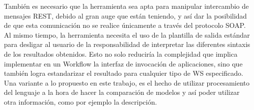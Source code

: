 También es necesario que la herramienta sea apta para manipular intercambio de mensajes REST, debido al gran auge que están teniendo, y así dar la posibilidad de que esta comunicación no se realice únicamente a través del protocolo SOAP.\\

Al mismo tiempo, la herramienta necesita el uso de la plantilla de salida estándar para desligar al usuario de la responsabilidad de interpretar las diferentes sintaxis de los resultados obtenidos. Esto no solo reduciría la complejidad que implica implementar en un Workflow la interfaz de invocación de aplicaciones, sino que también logra estandarizar el resultado para cualquier tipo de WS especificado.\\

Una variante a lo propuesto en este trabajo, es el hecho de utilizar procesamiento del lenguaje a la hora de hacer la comparación de modelos y así poder utilizar otra información, como por ejemplo la descripción. 